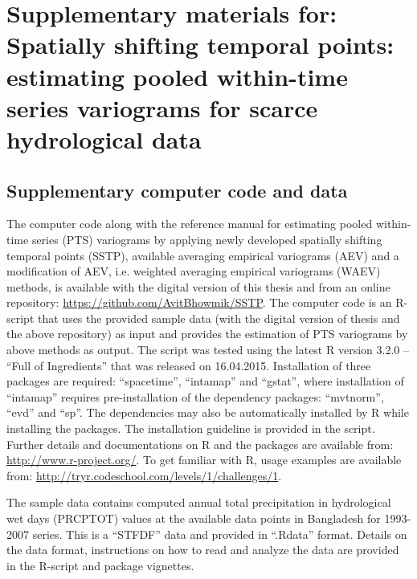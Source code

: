 \chapter{Supplementary materials for:\\Spatially shifting temporal points: estimating pooled within-time series variograms for scarce hydrological data}
\label{appendixB}

\section{Supplementary computer code and data}
\label{Supplementary computer code and data}

The computer code along with the reference manual for estimating pooled within-time series (PTS) variograms by applying newly developed spatially shifting temporal points (SSTP), available  averaging empirical variograms (AEV) and a modification of AEV, i.e. weighted averaging empirical variograms (WAEV) methods, is available with the digital version of this thesis and from an online repository: \href{https://github.com/AvitBhowmik/SSTP}{https://github.com/AvitBhowmik/SSTP}. The computer code is an R-script that uses the provided sample data (with the digital version of thesis and the above repository) as input and provides the estimation of PTS variograms by above methods as output. The script was tested using the latest R version 3.2.0 -- ``Full of Ingredients'' that was released on 16.04.2015. Installation of three packages are required: ``spacetime'', ``intamap'' and ``gstat'', where installation of ``intamap'' requires pre-installation of the dependency packages: ``mvtnorm'', ``evd'' and ``sp''. The dependencies may also be automatically installed by R while installing the packages. The installation guideline is provided in the script. Further details and documentations on R and the packages are available from: \href{http://www.r-project.org/}{http://www.r-project.org/}. To get familiar with R, usage examples are available from: \href{http://tryr.codeschool.com/levels/1/challenges/1}{http://tryr.codeschool.com/levels/1/challenges/1}.

The sample data contains computed annual total precipitation in hydrological wet days (PRCPTOT) values at the available data points in Bangladesh for 1993-2007 series. This is a ``STFDF'' data and provided in ``.Rdata'' format. Details on the data format, instructions on how to read and analyze the data are provided in the R-script and package vignettes.

